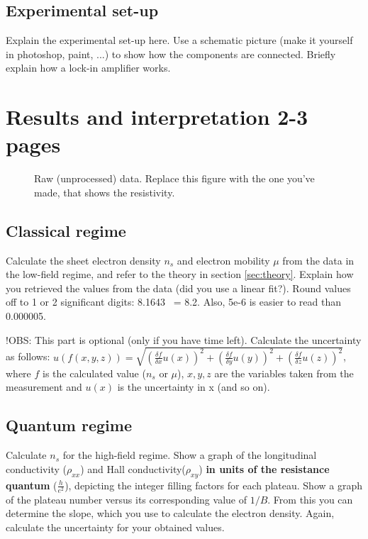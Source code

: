 \documentclass[a4paper]{article}
\begin{document}
\subsection{Experimental set-up}
Explain the experimental set-up here. Use a schematic picture (make it yourself in photoshop, paint, ...) to show how the components are connected. Briefly explain how a lock-in amplifier works.

\section{Results and interpretation 2-3 pages}

\begin{figure}
\centering
\caption{\label{fig:data}Raw (unprocessed) data. Replace this figure with the one you've made, that shows the resistivity.}
\end{figure}

\subsection{Classical regime}
Calculate the sheet electron density $n_{s}$ and electron mobility $\mu$ from the data in the low-field regime, and refer to the theory in section \ref{sec:theory}. Explain how you retrieved the values from the data (did you use a linear fit?).
Round values off to 1 or 2 significant digits: 8.1643 ~= 8.2. Also, 5e-6 is easier to read than 0.000005.

!OBS: This part is optional (only if you have time left).
Calculate the uncertainty as follows: \newline $u(f(x, y, z)) = \sqrt{(\frac{\delta f}{\delta{x}} u(x))^{2} + (\frac{\delta f}{\delta{y}} u(y))^{2} + (\frac{\delta f}{\delta{z}} u(z))^{2}}$, where $f$ is the calculated value ($n_{s}$ or $\mu$), $x, y, z$ are the variables taken from the measurement and $u(x)$ is the uncertainty in x (and so on).

\subsection{Quantum regime}
Calculate $n_{s}$ for the high-field regime.
Show a graph of the longitudinal conductivity ($\rho_{xx}$) and Hall conductivity($\rho_{xy}$) \textbf{in units of the resistance quantum} ($\frac{h}{e^{2}}$), depicting the integer filling factors for each plateau.
Show a graph of the plateau number versus its corresponding value of $1/B$. From this you can determine the slope, which you use to calculate the electron density.
Again, calculate the uncertainty for your obtained values.
\end{document}
